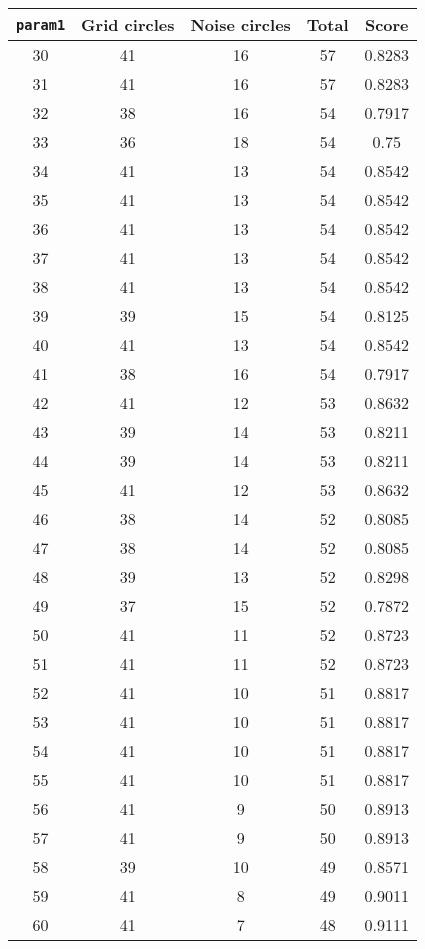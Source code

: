 \documentclass[letterpaper, 12pt]{article}
\begin{document}
\begin{longtable}{|c|c|c|c|c|}
\hline
\textbf{\texttt{param1}} & \textbf{Grid circles} & \textbf{Noise circles} & \textbf{Total} & \textbf{Score} \\
\hline
30 & 41 & 16 & 57 & 0.8283 \\
\hline
31 & 41 & 16 & 57 & 0.8283 \\
\hline
32 & 38 & 16 & 54 & 0.7917 \\
\hline
33 & 36 & 18 & 54 & 0.75 \\
\hline
34 & 41 & 13 & 54 & 0.8542 \\
\hline
35 & 41 & 13 & 54 & 0.8542 \\
\hline
36 & 41 & 13 & 54 & 0.8542 \\
\hline
37 & 41 & 13 & 54 & 0.8542 \\
\hline
38 & 41 & 13 & 54 & 0.8542 \\
\hline
39 & 39 & 15 & 54 & 0.8125 \\
\hline
40 & 41 & 13 & 54 & 0.8542 \\
\hline
41 & 38 & 16 & 54 & 0.7917 \\
\hline
42 & 41 & 12 & 53 & 0.8632 \\
\hline
43 & 39 & 14 & 53 & 0.8211 \\
\hline
44 & 39 & 14 & 53 & 0.8211 \\
\hline
45 & 41 & 12 & 53 & 0.8632 \\
\hline
46 & 38 & 14 & 52 & 0.8085 \\
\hline
47 & 38 & 14 & 52 & 0.8085 \\
\hline
48 & 39 & 13 & 52 & 0.8298 \\
\hline
49 & 37 & 15 & 52 & 0.7872 \\
\hline
50 & 41 & 11 & 52 & 0.8723 \\
\hline
51 & 41 & 11 & 52 & 0.8723 \\
\hline
52 & 41 & 10 & 51 & 0.8817 \\
\hline
53 & 41 & 10 & 51 & 0.8817 \\
\hline
54 & 41 & 10 & 51 & 0.8817 \\
\hline
55 & 41 & 10 & 51 & 0.8817 \\
\hline
56 & 41 & 9 & 50 & 0.8913 \\
\hline
57 & 41 & 9 & 50 & 0.8913 \\
\hline
58 & 39 & 10 & 49 & 0.8571 \\
\hline
59 & 41 & 8 & 49 & 0.9011 \\
\hline
60 & 41 & 7 & 48 & 0.9111 \\

\end{longtable}
\end{document}
